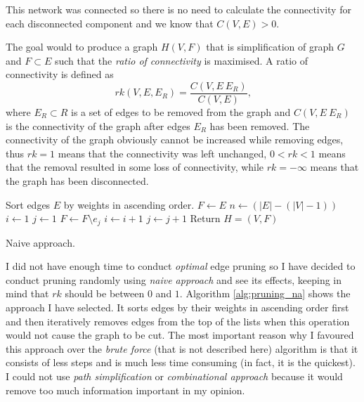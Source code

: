     This network was connected so there is no need to calculate the connectivity for each disconnected component and we know that $C(V, E) > 0$.
    
    The goal would to produce a graph $H(V, F)$ that is simplification of graph $G$ and $F \subset E$ such that the \emph{ratio of connectivity} is maximised. A ratio of connectivity is defined as
    \begin{equation}
     rk (V, E, E_R) = \frac{C(V, E \ E_R)}{C(V, E)} \mbox{,}
    \end{equation}
    where $E_R \subset R$ is a set of edges to be removed from the graph and $C(V, E \ E_R)$ is the connectivity of the graph after edges $E_R$ has been removed. The connectivity of the graph obviously cannot be increased while removing edges, thus $rk = 1$ means that the connectivity was left unchanged, $0 < rk < 1$ means that the removal resulted in some loss of connectivity, while $rk = -\infty$ means that the graph has been disconnected.
    
    \begin{algorithm}[H]
      \begin{algorithmic}[1]
          \State Sort edges $E$ by weights in ascending order.
          \State $F \gets E$
          \State $n \gets (|E| - (|V| - 1))$
          \State $i \gets 1$
          \State $j \gets 1$
              \State $F \gets F \setminus {e_j}$
              \State $i \gets i + 1$
            \EndIf
            \State $j \gets j + 1$
          \EndWhile
          \State Return $H = (V, F)$
        \EndProcedure
      \end{algorithmic}
      \caption{Naive approach.}
      \label{alg:pruning_na}
    \end{algorithm}
    I did not have enough time to conduct \emph{optimal} edge pruning so I have decided to conduct pruning randomly using \emph{naive approach} and see its effects, keeping in mind that $rk$ should be between $0$ and $1$. Algorithm \ref{alg:pruning_na} shows the approach I have selected. It sorts edges by their weights in ascending order first and then iteratively removes edges from the top of the lists when this operation would not cause the graph to be cut. The most important reason why I favoured this approach over the \emph{brute force} (that is not described here) algorithm is that it consists of less steps and is much less time consuming (in fact, it is the quickest)\cite{ZhouMahlerToivonen2012}. I could not use \emph{path simplification} or \emph{combinational approach} because it would remove too much information important in my opinion.
    
